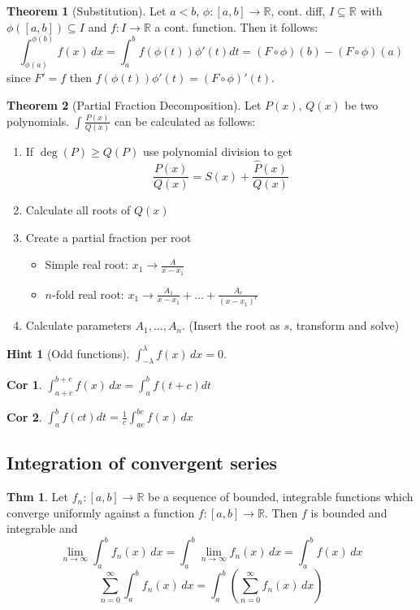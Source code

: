 \documentclass[a4paper, 10pt]{article}
\newtheorem*{corollary}{Cor}
\theoremstyle{definition}
\newtheorem*{theorem}{Thm}
\newtheorem*{note_wrapper}{Hint}
\theoremstyle{named}
\newtheorem*{ntheorem_wrapper}{Theorem}
\newenvironment{ntheorem}%
    {\begin{mdframed}[style=important]\begin{ntheorem_wrapper}}%
    {\end{ntheorem_wrapper}\end{mdframed}}
\newenvironment{note}%
    {\begin{mdframed}[style=trick]\begin{note_wrapper}}%
    {\end{note_wrapper}\end{mdframed}}
\newcommand{\R}{\mathbb{R}}
\begin{document}
\begin{ntheorem}[Substitution]
    Let $a < b$, $\phi: [a, b] \to \R$, cont. diff, $I \subseteq \R$ with $\phi([a, b]) \subseteq I$ and $f: I \to \R$ a cont. function. Then it follows:
    $$\int_{\phi(a)}^{\phi(b)} f(x) \,dx = \int_a^b f(\phi(t)) \phi'(t) dt = (F \circ \phi)(b) - (F \circ \phi)(a)$$
    since $F'=f$ then $f(\phi(t))\phi'(t) = (F \circ \phi)'(t)$.
\end{ntheorem}

\begin{ntheorem}[Partial Fraction Decomposition]
    Let $P(x)$, $Q(x)$ be two polynomials. $\int \frac{P(x)}{Q(x)}$ can be calculated as follows:
    \begin{enumerate}
        \item If $\deg(P) \geq Q(P)$ use polynomial division to get
        $$\frac{P(x)}{Q(x)} = S(x) + \frac{\hat{P}(x)}{Q(x)}$$
        \item Calculate all roots of $Q(x)$
        \item Create a partial fraction per root
        \begin{itemize}
            \item Simple real root: $x_1 \to \frac{A}{x - x_1}$
            \item $n$-fold real root: $x_1 \to \frac{A_1}{x - x_1} + \ldots + \frac{A_r}{(x - x_1)^r}$
        \end{itemize}
        \item Calculate parameters $A_1, \ldots, A_n$. (Insert the root as $s$, transform and solve)
    \end{enumerate}
\end{ntheorem}

\begin{note}[Odd functions]
    $\int_{-\lambda}^\lambda f(x) \, dx = 0$.
\end{note}

\begin{corollary}
    $\int_{a + c}^{b + c} f(x) \,dx = \int_a^b f(t + c) dt$
\end{corollary}

\begin{corollary}
    $\int_a^b f(ct) dt = \frac{1}{c} \int_{ac}^{bc} f(x) \,dx$
\end{corollary}

\subsection{Integration of convergent series}
\begin{theorem}
    Let $f_n: [a, b] \to \R$ be a sequence of bounded, integrable functions which converge uniformly against a function $f: [a, b] \to \R$. Then $f$ is bounded and integrable and
    $$\lim_{n \to \infty} \int_a^b f_n(x) \,dx = \int_a^b \lim_{n \to \infty}  f_n(x) \,dx = \int_a^b f(x) \,dx$$
    $$\sum_{n=0}^\infty \int_a^b f_n(x)\,dx = \int_a^b\left(\sum_{n=0}^\infty f_n(x)\,dx\right)$$
\end{theorem}
\end{document}
